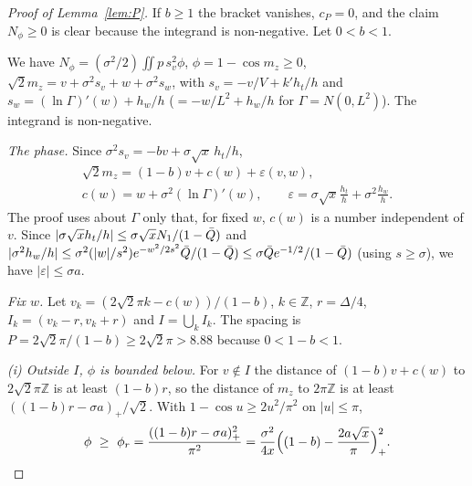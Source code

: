 \begin{proof}[Proof of Lemma~\ref{lem:P}]
If $b\ge1$ the bracket vanishes, $c_P=0$, and the claim $N_\phi\ge0$ is clear because the integrand is non-negative. Let $0<b<1$.

We have $N_\phi=(\sigma^2/2)\iint p\,s_v^2\phi$, $\phi=1-\cos m_z\ge0$, $\sqrt2m_z=v+\sigma^2s_v+w+\sigma^2s_w$, with $s_v=-v/V+k'h_t/h$ and $s_w=(\ln\Gamma)'(w)+h_w/h$ ($=-w/L^2+h_w/h$ for $\Gamma=N(0,L^2)$).
The integrand is non-negative.

\emph{The phase.}
Since $\sigma^2s_v=-bv+\sigma\sqrt x\,h_t/h$,
\begin{gather}
\sqrt2m_z=(1-b)v+c(w)+\varepsilon(v,w),\nonumber\\ c(w)=w+\sigma^2(\ln\Gamma)'(w),\qquad \varepsilon=\sigma\sqrt x\frac{h_t}h+\sigma^2\frac{h_w}h .
\end{gather}
The proof uses about $\Gamma$ only that, for fixed $w$, $c(w)$ is a number independent of $v$.
Since $|\sigma\sqrt xh_t/h|\le\sigma\sqrt xN_1/(1-\bar Q)$ and $|\sigma^2h_w/h|\le\sigma^2(|w|/s^2)e^{-w^2/2s^2}\bar Q/(1-\bar Q)\le\sigma\bar Q e^{-1/2}/(1-\bar Q)$ (using $s\ge\sigma$), we have $|\varepsilon|\le\sigma a$.

\emph{Fix $w$.}
Let $v_k=(2\sqrt2\pi k-c(w))/(1-b)$, $k\in\mathbb Z$, $r=\Delta/4$, $I_k=(v_k-r,v_k+r)$ and $I=\bigcup_kI_k$.
The spacing is $P=2\sqrt2\pi/(1-b)\ge2\sqrt2\pi>8.88$ because $0<1-b<1$.

\emph{(i) Outside $I$, $\phi$ is bounded below.}
For $v\notin I$ the distance of $(1-b)v+c(w)$ to $2\sqrt2\pi\mathbb Z$ is at least $(1-b)r$, so the distance of $m_z$ to $2\pi\mathbb Z$ is at least $((1-b)r-\sigma a)_+/\sqrt2$.
With $1-\cos u\ge2u^2/\pi^2$ on $|u|\le\pi$,
\begin{equation}
\phi\ \ge\ \phi_r=\frac{((1-b)r-\sigma a)_+^2}{\pi^2}=\frac{\sigma^2}{4x}\Bigl((1-b)-\frac{2a\sqrt x}\pi\Bigr)_+^2 .
\end{equation}


\end{proof}
